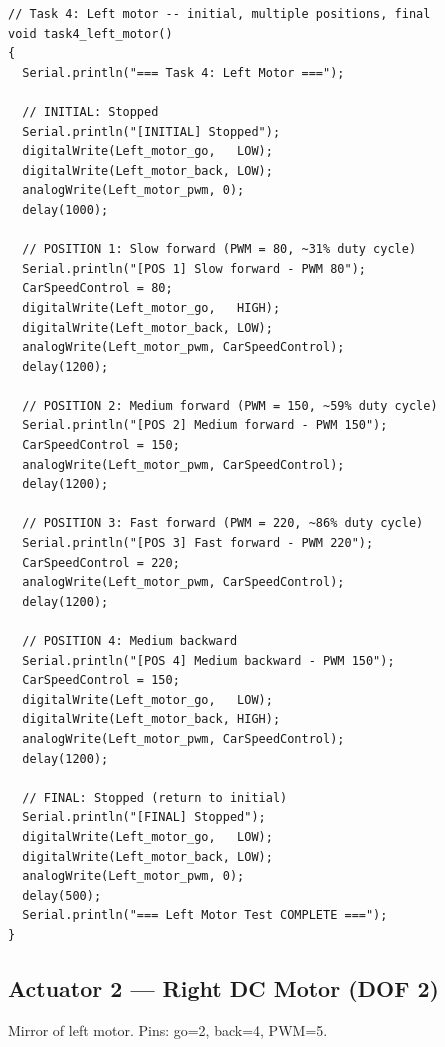 \documentclass[12pt,a4paper]{article}
\begin{document}
\begin{lstlisting}[style=arduino,caption={Task 4 --- Left motor position/state test}]
// Task 4: Left motor -- initial, multiple positions, final
void task4_left_motor()
{
  Serial.println("=== Task 4: Left Motor ===");

  // INITIAL: Stopped
  Serial.println("[INITIAL] Stopped");
  digitalWrite(Left_motor_go,   LOW);
  digitalWrite(Left_motor_back, LOW);
  analogWrite(Left_motor_pwm, 0);
  delay(1000);

  // POSITION 1: Slow forward (PWM = 80, ~31% duty cycle)
  Serial.println("[POS 1] Slow forward - PWM 80");
  CarSpeedControl = 80;
  digitalWrite(Left_motor_go,   HIGH);
  digitalWrite(Left_motor_back, LOW);
  analogWrite(Left_motor_pwm, CarSpeedControl);
  delay(1200);

  // POSITION 2: Medium forward (PWM = 150, ~59% duty cycle)
  Serial.println("[POS 2] Medium forward - PWM 150");
  CarSpeedControl = 150;
  analogWrite(Left_motor_pwm, CarSpeedControl);
  delay(1200);

  // POSITION 3: Fast forward (PWM = 220, ~86% duty cycle)
  Serial.println("[POS 3] Fast forward - PWM 220");
  CarSpeedControl = 220;
  analogWrite(Left_motor_pwm, CarSpeedControl);
  delay(1200);

  // POSITION 4: Medium backward
  Serial.println("[POS 4] Medium backward - PWM 150");
  CarSpeedControl = 150;
  digitalWrite(Left_motor_go,   LOW);
  digitalWrite(Left_motor_back, HIGH);
  analogWrite(Left_motor_pwm, CarSpeedControl);
  delay(1200);

  // FINAL: Stopped (return to initial)
  Serial.println("[FINAL] Stopped");
  digitalWrite(Left_motor_go,   LOW);
  digitalWrite(Left_motor_back, LOW);
  analogWrite(Left_motor_pwm, 0);
  delay(500);
  Serial.println("=== Left Motor Test COMPLETE ===");
}
\end{lstlisting}

\subsection{Actuator 2 --- Right DC Motor (DOF 2)}

\begin{donebox}{}
Mirror of left motor. Pins: go=2, back=4, PWM=5.
\end{donebox}
\end{document}
